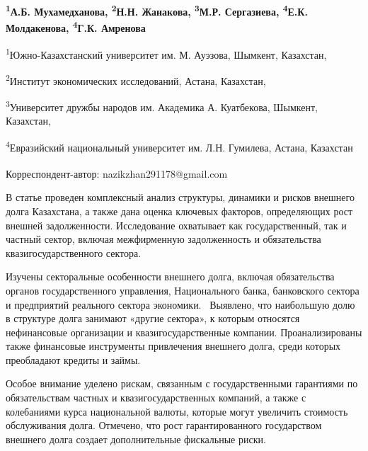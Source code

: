 
\begin{articleheader}

{\bfseries
\textsuperscript{1}А.Б. Мухамедханова,
\textsuperscript{2}Н.Н. Жанакова\textsuperscript{\envelope },
\textsuperscript{3}М.Р. Сергазиева,
\textsuperscript{4}Е.К. Молдакенова,
\textsuperscript{4}Г.К. Амренова
}
\end{articleheader}

\begin{affiliation}
\textsuperscript{1}Южно-Казахстанский университет им. М. Ауэзова, Шымкент, Казахстан,

\textsuperscript{2}Институт экономических исследований, Астана, Казахстан,

\textsuperscript{3}Университет дружбы народов им. Академика А. Куатбекова, Шымкент, Казахстан,

\textsuperscript{4}Евразийский национальный университет им. Л.Н. Гумилева, Астана, Казахстан

\raggedright \textsuperscript{\envelope }Корреспондент-автор: nazikzhan291178@gmail.com
\end{affiliation}

В статье проведен комплексный анализ структуры, динамики и рисков
внешнего долга Казахстана, а также дана оценка ключевых факторов,
определяющих рост внешней задолженности. Исследование охватывает как
государственный, так и частный сектор, включая межфирменную
задолженность и обязательства квазигосударственного сектора.

Изучены секторальные особенности внешнего долга, включая обязательства
органов государственного управления, Национального банка, банковского
сектора и предприятий реального сектора экономики. ~Выявлено, что
наибольшую долю в структуре долга занимают «другие сектора», к которым
относятся нефинансовые организации и квазигосударственные компании.
Проанализированы также финансовые инструменты привлечения внешнего
долга, среди которых преобладают кредиты и займы.

Особое внимание уделено рискам, связанным с государственными гарантиями
по обязательствам частных и квазигосударственных компаний, а также с
колебаниями курса национальной валюты, которые могут увеличить стоимость
обслуживания долга. Отмечено, что рост гарантированного государством
внешнего долга создает дополнительные фискальные риски.

